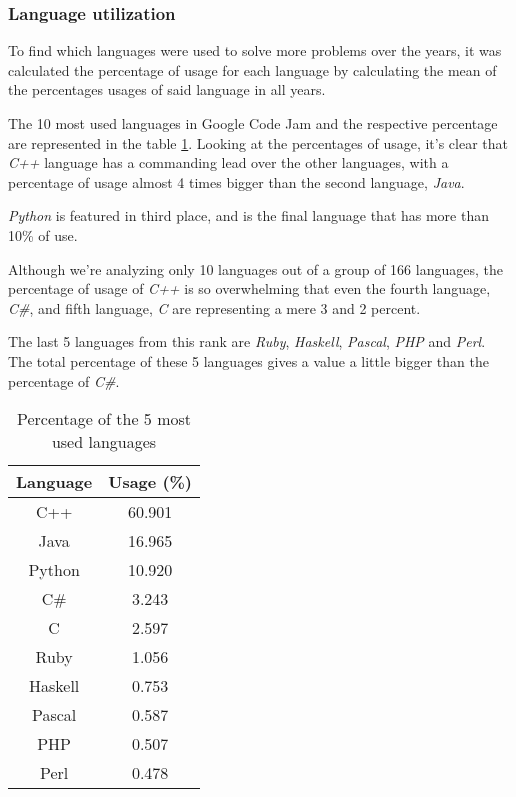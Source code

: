 \documentclass{article}
\begin{document}
\begin{multicols*}{2}
\subsubsection{Language utilization}

To find which languages were used to solve more problems over the years, it was calculated the percentage of usage for each language by calculating the mean of the percentages usages of said language in all years.

The 10 most used languages in Google Code Jam and the respective percentage are represented in the table \ref{lang_perc}.
Looking at the percentages of usage, it's clear that \textit{C++} language has a commanding lead over the other languages, with a percentage of usage almost 4 times bigger than the second language, \textit{Java}.

\textit{Python} is featured in third place, and is the final language that has more than 10\% of use.

Although we're analyzing only 10 languages out of a group of 166 languages, the percentage of usage of \textit{C++} is so overwhelming that even the fourth language, \textit{C\#}, and fifth language, \textit{C} are representing a mere 3 and 2 percent.

The last 5 languages from this rank are \textit{Ruby}, \textit{Haskell}, \textit{Pascal}, \textit{PHP} and \textit{Perl}. The total percentage of these 5 languages gives a value a little bigger than the percentage of \textit{C\#}.

\begin{table}[H]
\centering
\caption{Percentage of the 5 most used languages}
\label{lang_perc}
\begin{tabular}{c|c}
\textbf{Language} & \textbf{Usage (\%)} \\ \hline
C++               & 60.901       \\
Java              & 16.965       \\
Python            & 10.920       \\
C\#               & 3.243        \\
C                 & 2.597        \\
Ruby              & 1.056        \\
Haskell           & 0.753        \\
Pascal            & 0.587        \\
PHP               & 0.507        \\
Perl              & 0.478
\end{tabular}
\end{table}


\end{multicols*}
\end{document}
